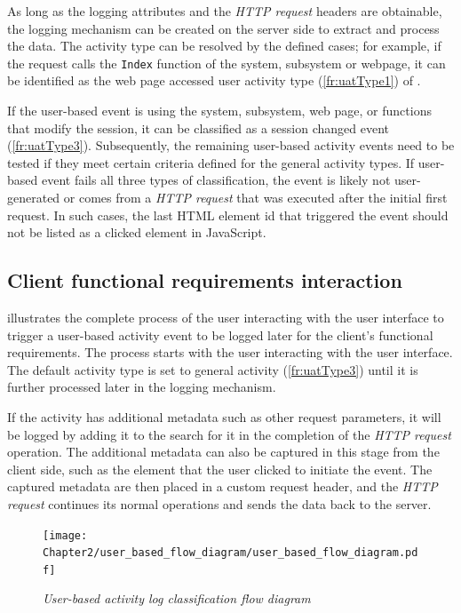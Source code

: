 As long as the logging attributes and the \textit{HTTP request} headers are obtainable, the logging mechanism can be created on the server side to extract and process the data. The activity type can be resolved by the defined cases; for example, if the request calls the \texttt{Index} function of the system, subsystem or webpage, it can be identified as the web page accessed user activity type (\ref{fr:uatType1}) of . \par If the user-based event is using the system, subsystem, web page, or functions that modify the session, it can be classified as a session changed event (\ref{fr:uatType3}). Subsequently, the remaining user-based activity events need to be tested if they meet certain criteria defined for the general activity types. If user-based event fails all three types of classification, the event is likely not user-generated or comes from a \textit{HTTP request} that was executed after the initial first request. In such cases, the last HTML element id that triggered the event should not be listed as a clicked element in JavaScript.

\subsection{Client functional requirements interaction}
 illustrates the complete process of the user interacting with the user interface to trigger a user-based activity event to be logged later for the client's functional requirements. The process starts with the user interacting with the user interface. The default activity type is set to general activity (\ref{fr:uatType3}) until it is further processed later in the logging mechanism. \par If the activity has additional metadata such as other request parameters, it will be logged by adding it to the search for it in the completion of the \textit{HTTP request} operation. The additional metadata can also be captured in this stage from the client side, such as the element that the user clicked to initiate the event. The captured metadata are then placed in a custom request header, and the \textit{HTTP request} continues its normal operations and sends the data back to the server.

\clearpage

\begin{figure}[!htb] %
	\centering %
	\texttt{[image: Chapter2/user\_based\_flow\_diagram/user\_based\_flow\_diagram.pdf]}
	\caption[User-based activity log classification flow diagram]
	{\textit{User-based activity log classification flow diagram}}\label{fig:ch2_user_based_actvity_classification}
\end{figure}


